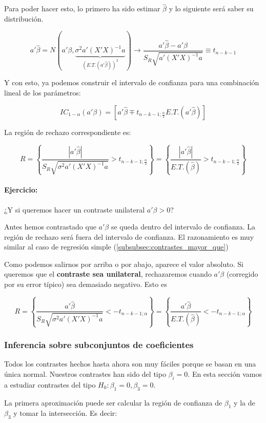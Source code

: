 Para poder hacer esto, lo primero ha sido estimar $\hat{β}$ y lo siguiente será saber su distribución.

\[a'\hat{β} = N\left(a'β,\underbrace{σ^2a'(X'X)^{-1}a}_{\left(E.T.(a'\hat{β})\right)^2}\right) \to \frac{a'\hat{β} - a'β}{S_R\sqrt{a'(X'X)^{-1}a}} \equiv t_{n-k-1}\]

Y con esto, ya podemos construir el intervalo de confianza para una combinación lineal de los parámetros:

\[
IC_{1-α}(a'β) = \left[ a'\hat{β} \mp t_{n-k-1;\frac{α}{2}}E.T.(a'\hat{β}) \right]
\]

La región de rechazo correspondiente es:

\[
R = \left\{ \frac{|a'\hat{β}|}{S_R\sqrt{σ^2a'(X'X)^{-1}a}} >  t_{n-k-1;\frac{α}{2}} \right\} = \left\{ \frac{|a'\hat{β}|}{E.T.(\hat{β})} >  t_{n-k-1;\frac{α}{2}} \right\}
\]

\paragraph{Ejercicio:} ¿Y si queremos hacer un contraste unilateral $a'β > 0$? 


Antes hemos contrastado que $a'β$ se queda dentro del intervalo de confianza. La región de rechazo será fuera del intervalo de confianza. El razonamiento es muy similar al caso de regresión simple (\ref{subsubsec:contrastes_mayor_que}) 

Como podemos salirnos por arriba o por abajo, aparece el valor absoluto.
Si queremos que el \textbf{contraste sea unilateral}, rechazaremos cuando $a'β$ (corregido por su error típico) sea demasiado negativo. Esto es

\[
R = \left\{ \frac{a'\hat{β}}{S_R\sqrt{σ^2a'(X'X)^{-1}a}} < -  t_{n-k-1;α} \right\} = \left\{ \frac{a'\hat{β}}{E.T.(\hat{β})} < -  t_{n-k-1;α} \right\}
\]


\subsubsection{Inferencia sobre subconjuntos de coeficientes}

Todos los contrastes hechos hasta ahora son muy fáciles porque se basan en una única normal. Nuestros contrastes han sido del tipo $β_i = 0$. En esta sección vamos a estudiar contrastes del tipo $H_0: β_1 = 0, β_3 = 0$.

La primera aproximación puede ser calcular la región de confianza de $β_1$ y la de $β_3$ y tomar la intersección. Es decir:

